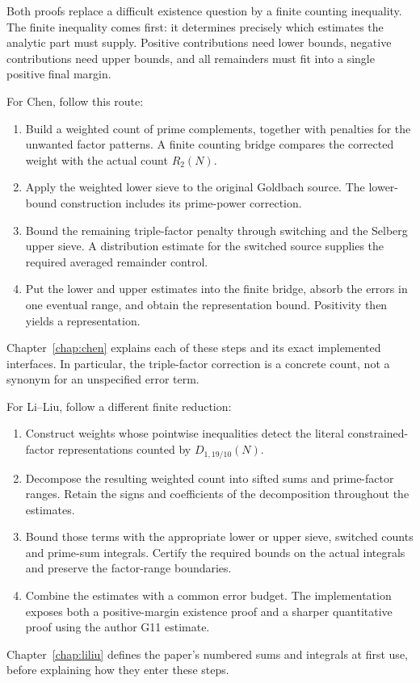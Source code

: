 Both proofs replace a difficult existence question by a finite counting
inequality. The finite inequality comes first: it determines precisely
which estimates the analytic part must supply. Positive contributions need
lower bounds, negative contributions need upper bounds, and all remainders
must fit into a single positive final margin.

For Chen, follow this route:
\begin{enumerate}
\item Build a weighted count of prime complements, together with penalties
      for the unwanted factor patterns. A finite counting bridge compares
      the corrected weight with the actual count $R_2(N)$.
\item Apply the weighted lower sieve to the original Goldbach source.
      The lower-bound construction includes its prime-power correction.
\item Bound the remaining triple-factor penalty through switching and the
      Selberg upper sieve. A distribution estimate for the switched source
      supplies the required averaged remainder control.
\item Put the lower and upper estimates into the finite bridge, absorb the
      errors in one eventual range, and obtain the representation bound.
      Positivity then yields a representation.
\end{enumerate}
Chapter~\ref{chap:chen} explains each of these steps and its exact implemented
interfaces. In particular, the triple-factor correction is a concrete
count, not a synonym for an unspecified error term.

For Li--Liu, follow a different finite reduction:
\begin{enumerate}
\item Construct weights whose pointwise inequalities detect the literal
      constrained-factor representations counted by $D_{1,19/10}(N)$.
\item Decompose the resulting weighted count into sifted sums and
      prime-factor ranges. Retain the signs and coefficients of the
      decomposition throughout the estimates.
\item Bound those terms with the appropriate lower or upper sieve, switched
      counts and prime-sum integrals. Certify the required bounds on the
      actual integrals and preserve the factor-range boundaries.
\item Combine the estimates with a common error budget. The implementation
      exposes both a positive-margin existence proof and a sharper
      quantitative proof using the author G11 estimate.
\end{enumerate}
Chapter~\ref{chap:liliu} defines the paper's numbered sums and integrals at
first use, before explaining how they enter these steps.

